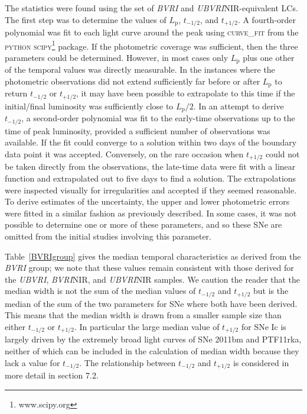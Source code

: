 \documentclass[a4paper,fleqn,usenatbib]{mnras}
\begin{document}
The statistics were found using the set of \textit{BVRI} and \textit{UBVRI}NIR-equivalent LCs. The first step was to determine the values of $L_{\mathrm{p}}$, $t_{-1/2}$, and $t_{+1/2}$. A fourth-order polynomial was fit to each light curve around the peak using \textsc{curve\_fit} from the \textsc{python} \textsc{scipy}\footnote{www.scipy.org} package. If the photometric coverage was sufficient, then the three parameters could be determined. However, in most cases only $L_{\mathrm{p}}$ plus one other of the temporal values was directly measurable. In the instances where the photometric observations did not extend sufficiently far before or after $L_{\mathrm{p}}$ to return  $t_{-1/2}$ or $t_{+1/2}$, it may have been possible to extrapolate to this time if the initial/final luminosity was sufficiently close to $L_{\mathrm{p}}/2$. In an attempt to derive $t_{-1/2}$, a second-order polynomial was fit to the early-time observations up to the time of peak luminosity, provided a sufficient number of observations was available. If the fit could converge to a solution within two days of the boundary data point it was accepted. Conversely, on the rare occasion when $t_{+1/2}$ could not be taken directly from the observations, the late-time data were fit with a linear function and extrapolated out to five days to find a solution. The extrapolations were inspected visually for irregularities and  accepted if they seemed reasonable. To derive estimates of the uncertainty, the upper and lower photometric errors were fitted in a similar fashion as previously described. In some cases, it was not possible to determine one or more of these parameters, and so these SNe are omitted from the initial studies involving this parameter. 

Table~\ref{BVRIgroup} gives the median temporal characteristics as derived from the {\it BVRI} group; we note that these values remain consistent with those derived for the {\it UBVRI}, {\it BVRI}NIR, and {\it UBVRI}NIR samples. We caution the reader that the median width is not the sum of the median values of $t_{-1/2}$ and $t_{+1/2}$ but is the median of the sum of the two parameters for SNe where both have been derived. This means that the median width is drawn from a smaller sample size than either $t_{-1/2}$ or $t_{+1/2}$. In particular the large median value of $t_{+1/2}$ for SNe Ic is largely driven by the extremely broad light curves of SNe 2011bm \citep{Valenti2012} and PTF11rka, neither of which can be included in the calculation of median width because they lack a value for $t_{-1/2}$. The relationship between $t_{-1/2}$ and $t_{+1/2}$ is considered in more detail in section 7.2.
\end{document}
